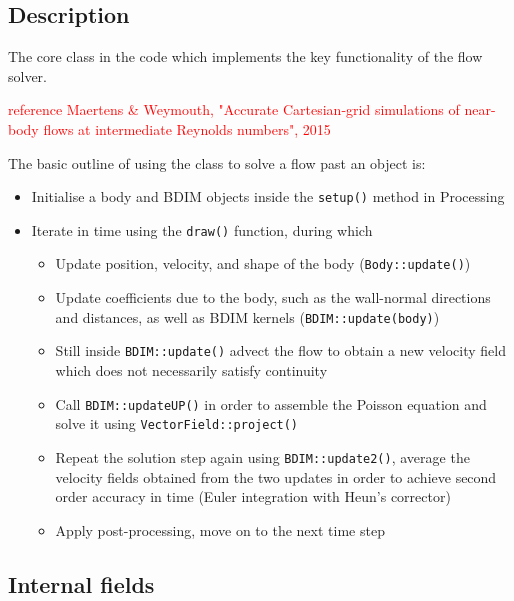 \documentclass[notitlepage]{article}
\begin{document}
\subsection{Description}

The core class in the code which implements the key functionality of the flow solver.

\textcolor{red}{reference Maertens \& Weymouth, "Accurate Cartesian-grid simulations of near-body flows at intermediate Reynolds numbers", 2015}

The basic outline of using the class to solve a flow past an object is:

\begin{itemize}
\item Initialise a body and BDIM objects inside the \texttt{setup()} method in Processing
\item Iterate in time using the \texttt{draw()} function, during which
	\begin{itemize}
	\item Update position, velocity, and shape of the body (\texttt{Body::update()})
	\item Update coefficients due to the body, such as the wall-normal directions and distances,
		as well as BDIM kernels (\texttt{BDIM::update(body)})
	\item Still inside \texttt{BDIM::update()} advect the flow to obtain a new velocity field which
		does not necessarily satisfy continuity
	\item Call \texttt{BDIM::updateUP()} in order to assemble the Poisson equation and solve it using
		\texttt{VectorField::project()}
	\item Repeat the solution step again using \texttt{BDIM::update2()}, average the velocity fields
		obtained from the two updates in order to achieve second order accuracy in time (Euler integration
		with Heun's corrector)
	\item Apply post-processing, move on to the next time step
	\end{itemize}
\end{itemize}

\subsection{Internal fields}
\end{document}
